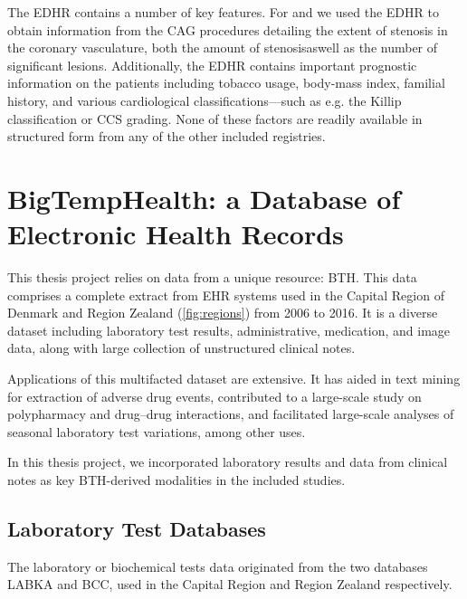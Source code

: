 The \ac{EDHR} contains a number of key features.
For \studyii{} and \studyiii{} we used the \ac{EDHR} to 
obtain information from the \ac{CAG} procedures 
detailing the extent of stenosis in the coronary vasculature, 
both the amount of stenosis\footnotemark aswell 
as the number of significant lesions.
Additionally, the \ac{EDHR} contains important prognostic information 
on the patients including tobacco usage, body-mass index, familial history,
and various cardiological classifications---such as e.g. the 
Killip classification
or \ac{CCS} grading.
None of these factors are readily available in structured form from
any of the other included registries.


\section{BigTempHealth: a Database of Electronic Health Records}

This thesis project relies on data from a unique resource: \ac{BTH}. 
This data comprises a complete extract from \ac{EHR} systems used in
the Capital Region of Denmark and Region Zealand (\cref{fig:regions})
from 2006 to 2016.  
It is a diverse dataset including
laboratory test results, administrative, medication, and image data,
along with large collection of unstructured clinical notes.  

Applications of this multifacted dataset are extensive.
It has aided in 
text mining for extraction of adverse drug events,
contributed to a large-scale study on polypharmacy and drug--drug interactions,
\autocite{rodriguezDrug2023}
and facilitated large-scale analyses of seasonal laboratory test variations,
\autocite{musePopulationwide2023} 
among other uses.

In this thesis project, we incorporated laboratory results 
and data from clinical notes as key \ac{BTH}-derived modalities 
in the included studies.

\subsection{Laboratory Test Databases}

The laboratory or biochemical tests data originated from the two databases
\ac{LABKA} and \ac{BCC}, used in the Capital Region and Region Zealand
respectively.

